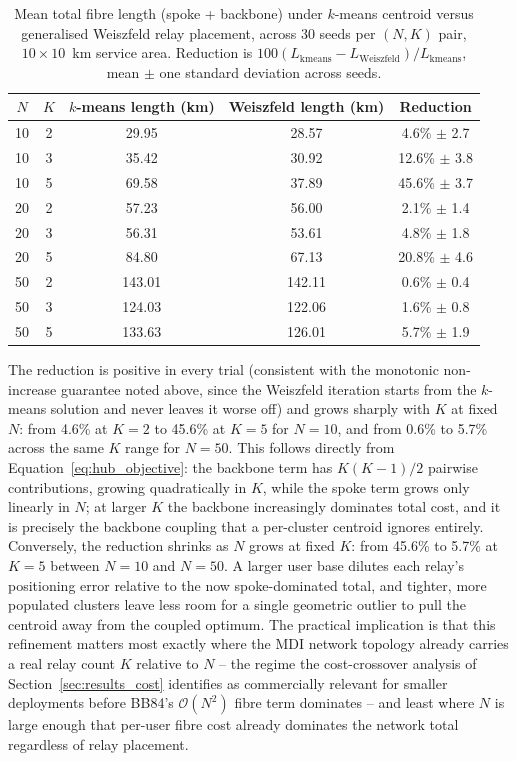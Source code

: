 \documentclass[12pt]{article}
\begin{document}
\begin{table}[H]
\centering
\begin{tabular}{ccccc}
\toprule
$N$ & $K$ & $k$-means length (km) & Weiszfeld length (km) & Reduction \\
\midrule
10 & 2 & 29.95 & 28.57 & 4.6\% $\pm$ 2.7 \\
10 & 3 & 35.42 & 30.92 & 12.6\% $\pm$ 3.8 \\
10 & 5 & 69.58 & 37.89 & 45.6\% $\pm$ 3.7 \\
20 & 2 & 57.23 & 56.00 & 2.1\% $\pm$ 1.4 \\
20 & 3 & 56.31 & 53.61 & 4.8\% $\pm$ 1.8 \\
20 & 5 & 84.80 & 67.13 & 20.8\% $\pm$ 4.6 \\
50 & 2 & 143.01 & 142.11 & 0.6\% $\pm$ 0.4 \\
50 & 3 & 124.03 & 122.06 & 1.6\% $\pm$ 0.8 \\
50 & 5 & 133.63 & 126.01 & 5.7\% $\pm$ 1.9 \\
\bottomrule
\end{tabular}
\caption{Mean total fibre length (spoke + backbone) under $k$-means centroid versus generalised Weiszfeld relay placement, across 30 seeds per $(N,K)$ pair, $10\times10$~km service area. Reduction is $100(L_\text{kmeans}-L_\text{Weiszfeld})/L_\text{kmeans}$, mean $\pm$ one standard deviation across seeds.}
\label{tab:relay_comparison}
\end{table}

The reduction is positive in every trial (consistent with the monotonic non-increase guarantee noted above, since the Weiszfeld iteration starts from the $k$-means solution and never leaves it worse off) and grows sharply with $K$ at fixed $N$: from 4.6\% at $K=2$ to 45.6\% at $K=5$ for $N=10$, and from 0.6\% to 5.7\% across the same $K$ range for $N=50$. This follows directly from Equation~\ref{eq:hub_objective}: the backbone term has $K(K-1)/2$ pairwise contributions, growing quadratically in $K$, while the spoke term grows only linearly in $N$; at larger $K$ the backbone increasingly dominates total cost, and it is precisely the backbone coupling that a per-cluster centroid ignores entirely. Conversely, the reduction shrinks as $N$ grows at fixed $K$: from 45.6\% to 5.7\% at $K=5$ between $N=10$ and $N=50$. A larger user base dilutes each relay's positioning error relative to the now spoke-dominated total, and tighter, more populated clusters leave less room for a single geometric outlier to pull the centroid away from the coupled optimum. The practical implication is that this refinement matters most exactly where the MDI network topology already carries a real relay count $K$ relative to $N$ -- the regime the cost-crossover analysis of Section~\ref{sec:results_cost} identifies as commercially relevant for smaller deployments before BB84's $\mathcal{O}(N^2)$ fibre term dominates -- and least where $N$ is large enough that per-user fibre cost already dominates the network total regardless of relay placement.
\end{document}
